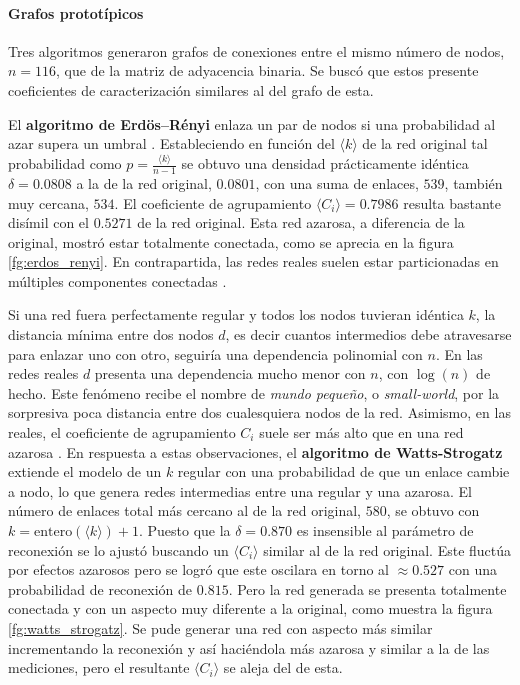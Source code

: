 \documentclass{article}
\begin{document}
\paragraph{Grafos prototípicos}
Tres algoritmos generaron grafos de conexiones entre el mismo número de nodos, $n = 116$, que de la matriz de adyacencia binaria.
Se buscó que estos presente coeficientes de caracterización similares al del grafo de esta.

El \textbf{algoritmo de Erdös–Rényi} enlaza un par de nodos si una probabilidad al azar supera un umbral \cite[sección 3.2]{albert-laszlo_barabasi_network_2016}.
Estableciendo en función del $\langle k \rangle$ de la red original tal probabilidad como $p = \frac{\langle k \rangle}{n -1}$ se obtuvo una densidad prácticamente idéntica $\delta = 0.0808$ a la de la red original, $0.0801$, con una suma de enlaces, $539$, también muy cercana, $534$. 
El coeficiente de agrupamiento $\langle C_i \rangle = 0.7986$ resulta bastante disímil con el $0.5271$ de la red original.
Esta red azarosa, a diferencia de la original, mostró estar totalmente conectada, como se aprecia en la figura \ref{fg:erdos_renyi}. 
En contrapartida, las redes reales suelen estar particionadas en múltiples componentes conectadas \cite[sección 3.7]{albert-laszlo_barabasi_network_2016}.

Si una red fuera perfectamente regular y todos los nodos tuvieran idéntica $k$, la distancia mínima entre dos nodos $d$, es decir cuantos intermedios debe atravesarse para enlazar uno con otro, seguiría una dependencia polinomial con $n$.
En las redes reales $d$ presenta una dependencia mucho menor con $n$, con $\log(n)$ de hecho.
Este fenómeno recibe el nombre de \emph{mundo pequeño}, o \emph{small-world}, por la sorpresiva poca distancia entre dos cualesquiera nodos de la red.
Asimismo, en las reales, el coeficiente de agrupamiento $C_i$ suele ser más alto que en una red azarosa \cite[sección 3.9]{albert-laszlo_barabasi_network_2016}. 
En respuesta a estas observaciones, el \textbf{algoritmo de Watts-Strogatz} extiende el modelo de un $k$ regular con una probabilidad de que un enlace cambie a nodo, lo que genera redes intermedias entre una regular y una azarosa.
El número de enlaces total más cercano al de la red original, $580$, se obtuvo con $k = \mathrm{entero}(\langle k \rangle) + 1$. 
Puesto que la $\delta = 0.870$ es insensible al parámetro de reconexión se lo ajustó buscando un $\langle C_i \rangle$ similar al de la red original.
Este fluctúa por efectos azarosos pero se logró que este oscilara en torno al $\approx 0.527$ con una probabilidad de reconexión de $0.815$.
Pero la red generada se presenta totalmente conectada y con un aspecto muy diferente a la original, como muestra la figura \ref{fg:watts_strogatz}. 
Se pude generar una red con aspecto más similar incrementando la reconexión y así haciéndola más azarosa y similar a la de las mediciones, pero el resultante $\langle C_i \rangle$ se aleja del de esta.
\end{document}
